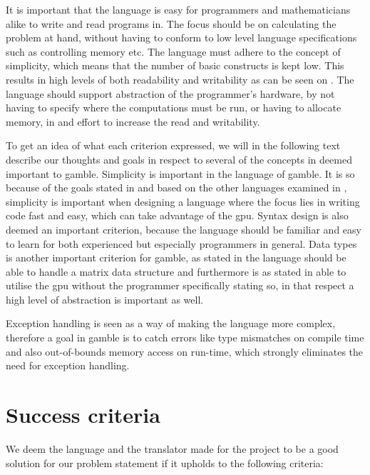 It is important that the language is easy for programmers and mathematicians alike to write and read programs in.
The focus should be on calculating the problem at hand, without having to conform to low level language specifications such as controlling memory etc.
The language must adhere to the concept of simplicity, which means that the number of basic constructs is kept low. 
This results in high levels of both readability and writability as can be seen on .
The language should support abstraction of the programmer's hardware, by not having to specify where the computations must be run, or having to allocate memory, in and effort to increase the read and writability. 

To get an idea of what each criterion expressed, we will in the following text describe our thoughts and goals in respect to several of the concepts in  deemed important to \gls{gamble}.
Simplicity is important in the language of \gls{gamble}.
It is so because of the goals stated in  and based on the other languages examined in , simplicity is important when designing a language where the focus lies in writing code fast and easy, which can take advantage of the \acrshort{gpu}.
Syntax design is also deemed an important criterion, because the language should be familiar and easy to learn for both experienced but especially programmers in general.
Data types is another important criterion for \gls{gamble}, as stated in  the language should be able to handle a matrix data structure and furthermore is as stated in  able to utilise the \acrshort{gpu} without the programmer specifically stating so, in that respect a high level of abstraction is important as well. 

Exception handling is seen as a way of making the language more complex, therefore a goal in \gls{gamble} is to catch errors like type mismatches on compile time and also out-of-bounds memory access on run-time, which strongly eliminates the need for exception handling.

\section{Success criteria}\label{sec:OurCriterias}
We deem the language and the translator made for the project to be a good solution for our problem statement if it upholds to the following criteria:

